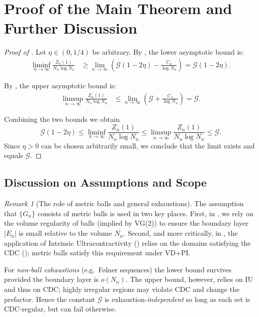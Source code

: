 \documentclass[12pt]{amsart}
\theoremstyle{definition}
\theoremstyle{remark}
\newtheorem{remark}[theorem]{Remark}
\newcommand{\cG}{\mathcal{G}}    %
\begin{document}
\section{Proof of the Main Theorem and Further Discussion}\label{sec:discussion}

\begin{proof}[Proof of ]
Let $\eta \in (0,1/4)$ be arbitrary. By , the lower asymptotic bound is:
\begin{align*}
\liminf_{n \to \infty} \frac{Z_n(1)}{N_n \log N_n} &\geq \lim_{n \to \infty} \left( \cG(1-2\eta) - \frac{C_2}{\log N_n} \right) = \cG(1-2\eta).
\end{align*}

By , the upper asymptotic bound is:
\begin{align*}
\limsup_{n \to \infty} \frac{Z_n(1)}{N_n \log N_n} &\leq \lim_{n \to \infty} \left( \cG + \frac{C_4}{\log N_n} \right) = \cG.
\end{align*}

Combining the two bounds we obtain
\[
\cG(1-2\eta) \leq \liminf_{n \to \infty} \frac{Z_n(1)}{N_n \log N_n} \leq \limsup_{n \to \infty} \frac{Z_n(1)}{N_n \log N_n} \leq \cG.
\]
Since $\eta > 0$ can be chosen arbitrarily small, we conclude that the limit exists and equals $\cG$.
\end{proof}

\subsection{Discussion on Assumptions and Scope}

\begin{remark}[The role of metric balls and general exhaustions]
The assumption that $\{G_n\}$ consists of metric balls is used in two key places. First, in , we rely on the volume regularity of balls (implied by VG(2)) to ensure the boundary layer $|E_n|$ is small relative to the volume $N_n$. Second, and more critically, in , the application of Intrinsic Ultracontractivity () relies on the domains satisfying the CDC (); metric balls satisfy this requirement under VD+PI.

For \emph{non-ball exhaustions} (e.g.\ Følner sequences) the lower bound survives provided the boundary layer is $o(N_n)$. The upper bound, however, relies on IU and thus on CDC; highly irregular regions may violate CDC and change the prefactor. Hence the constant $\cG$ is exhaustion-\emph{independent} so long as each set is CDC-regular, but can fail otherwise.
\end{remark}
\end{document}

